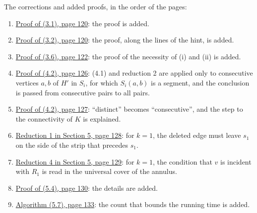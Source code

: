 The corrections and added proofs, in the order of the pages:
\begin{enumerate}\setlength{\itemsep}{1pt}
\item {}\hyperref[fix:3.1-proof-added]{Proof of (3.1), page 120}: the proof is added.
\item {}\hyperref[fix:3.2-proof-added]{Proof of (3.2), page 120}: the proof, along the lines of the hint, is added.
\item {}\hyperref[fix:3.6-necessity-added]{Proof of (3.6), page 122}: the proof of the necessity of (i) and (ii) is added.
\item {}\hyperref[fix:4.2-proof-p126]{Proof of (4.2), page 126}: (4.1) and reduction 2 are applied only to consecutive vertices $a, b$ of $H'$ in $S_i$, for which $S_i(a, b)$ is a segment, and the conclusion is passed from consecutive pairs to all pairs.
\item {}\hyperref[fix:4.2-proof-p127]{Proof of (4.2), page 127}: ``distinct'' becomes ``consecutive'', and the step to the connectivity of $K$ is explained.
\item {}\hyperref[fix:5-reduction1]{Reduction 1 in Section 5, page 128}: for $k=1$, the deleted edge must leave $s_1$ on the side of the strip that precedes $s_1$.
\item {}\hyperref[fix:5-reduction4]{Reduction 4 in Section 5, page 129}: for $k=1$, the condition that $v$ is incident with $R_1$ is read in the universal cover of the annulus.
\item {}\hyperref[fix:5.4-proof-added]{Proof of (5.4), page 130}: the details are added.
\item {}\hyperref[fix:5.7-time-added]{Algorithm (5.7), page 133}: the count that bounds the running time is added.
\end{enumerate}
